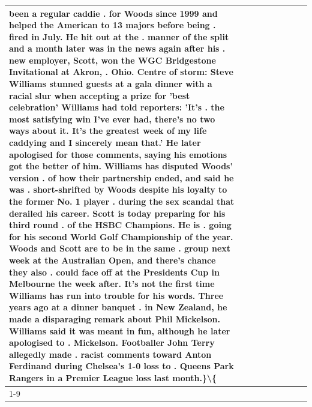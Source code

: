 \begin{table}[H]
\begin{tabular}{lllrlllll}
been a regular caddie . for Woods since 1999 and helped the American to 13 majors before being . fired in July. He hit out at the . manner of the split and a month later was in the news again after his . new employer, Scott, won the WGC Bridgestone Invitational at Akron, . Ohio. Centre of storm: Steve Williams stunned guests at a gala dinner with a racial slur when accepting a prize for 'best celebration' Williams had told reporters: 'It's . the most satisfying win I've ever had, there's no two ways about it. It's the greatest week of my life caddying and I sincerely mean that.' He later apologised for those comments, saying his emotions got the better of him. Williams has disputed Woods' version . of how their partnership ended, and said he was . short-shrifted by Woods despite his loyalty to the former No. 1 player . during the sex scandal that derailed his career. Scott is today preparing for his third round . of the HSBC Champions. He is . going for his second World Golf Championship of the year. Woods and Scott are to be in the same . group next week at the Australian Open, and there's chance they also . could face off at the Presidents Cup in Melbourne the week after. It's not the first time Williams has run into trouble for his words. Three years ago at a dinner banquet . in New Zealand, he made a disparaging remark about Phil Mickelson. Williams said it was meant in fun, although he later apologised to . Mickelson. Footballer John Terry allegedly made . racist comments toward Anton Ferdinand during Chelsea's 1-0 loss to . Queens Park Rangers in a Premier League loss last month.\}\textbackslash \{ \\
\cline{1-9}

\end{tabular}
\end{table}
